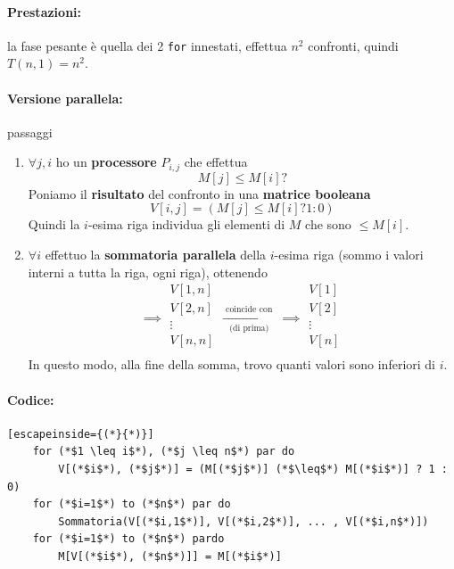 \documentclass[11pt]{article}
\begin{document}
	
	\paragraph{Prestazioni:} la fase pesante è quella dei 2 \texttt{for} innestati, effettua $n^2$ confronti, quindi $T(n,1) = n^2$.\\
	
	\newpage
	
	\paragraph{Versione parallela:} passaggi
	
	\begin{enumerate}
		\item $\forall j,i$ ho un \textbf{processore} $P_{i,j}$ che effettua 
		$$ M[j] \leq M[i] ? $$
		Poniamo il \textbf{risultato} del confronto in una \textbf{matrice booleana}
		$$ V[i,j] = (M[j] \leq M[i] ? 1 : 0 )$$
		Quindi la $i$-esima riga individua gli elementi di $M$ che sono $\leq M[i]$.\\
		
		\item $\forall i$ effettuo la \textbf{sommatoria parallela} della $i$-esima riga (sommo i valori interni a tutta la riga, ogni riga), ottenendo
		$$
		\implies \begin{array}{c}
			V[1,n] \\
			V[2,n] \\
			\vdots \\
			V[n,n] \\
		\end{array}
		\xrightarrow[\text{ (di prima) }]{\text{ coincide con }}
		\implies \begin{array}{c}
			V[1] \\
			V[2] \\
			\vdots \\
			V[n] \\
		\end{array}
		$$
		In questo modo, alla fine della somma, trovo quanti valori sono inferiori di $i$.\\
	\end{enumerate}
	
	\paragraph{Codice:} 
	\begin{lstlisting}[escapeinside={(*}{*)}]
	for (*$1 \leq i$*), (*$j \leq n$*) par do
		V[(*$i$*), (*$j$*)] = (M[(*$j$*)] (*$\leq$*) M[(*$i$*)] ? 1 : 0)
	for (*$i=1$*) to (*$n$*) par do
		Sommatoria(V[(*$i,1$*)], V[(*$i,2$*)], ... , V[(*$i,n$*)])
	for (*$i=1$*) to (*$n$*) pardo
		M[V[(*$i$*), (*$n$*)]] = M[(*$i$*)]
	\end{lstlisting}
	
\end{document}
